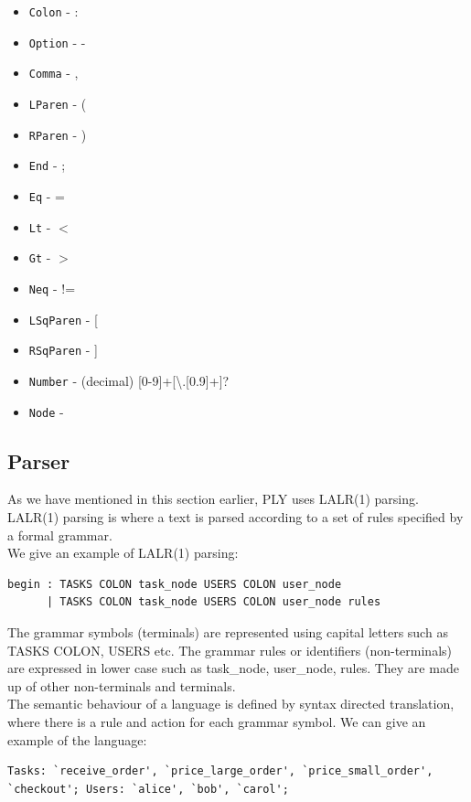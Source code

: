 \documentclass[a4paper]{report}
\begin{document}
\begin{itemize}
\item \texttt{Colon} - : 
\item \texttt{Option} - -
\item \texttt{Comma} - ,
\item \texttt{LParen} - (
\item \texttt{RParen} - )
\item \texttt{End} - ;
\item \texttt{Eq} - =
\item \texttt{Lt} - $<$
\item \texttt{Gt} - $>$
\item \texttt{Neq} - !=
\item \texttt{LSqParen} - [
\item \texttt{RSqParen} - ]
\item \texttt{Number} - (decimal)  [0-9]+[\textbackslash.[0.9]+]?
\item \texttt{Node} - 
\end{itemize}

\subsection{Parser}
As we have mentioned in this section earlier, PLY uses LALR(1) parsing. LALR(1) parsing is where a text is parsed according to a set of rules specified by a formal grammar.\\
We give an example of LALR(1) parsing:
\lstset{numbers=none, showspaces=false,
    showstringspaces=false, tabsize=2, breaklines=true,
    xleftmargin=5.0ex,
}
\begin{lstlisting}[frame=single]
begin : TASKS COLON task_node USERS COLON user_node
      | TASKS COLON task_node USERS COLON user_node rules
\end{lstlisting}

The grammar symbols (terminals) are represented using capital letters such as TASKS COLON, USERS etc. The grammar rules or identifiers (non-terminals) are expressed in lower case such as task\_node, user\_node, rules. They are made up of other non-terminals and terminals.\\	

The semantic behaviour of a language is defined by syntax directed translation, where there is a rule and action for each grammar symbol. We can give an example of the language:
\lstset{numbers=none, showspaces=false,
    showstringspaces=false, tabsize=2, breaklines=true,
    xleftmargin=5.0ex,
}
\begin{lstlisting}[frame=single]
Tasks: `receive_order', `price_large_order', `price_small_order', 
`checkout'; Users: `alice', `bob', `carol';
\end{lstlisting}
\end{document}
